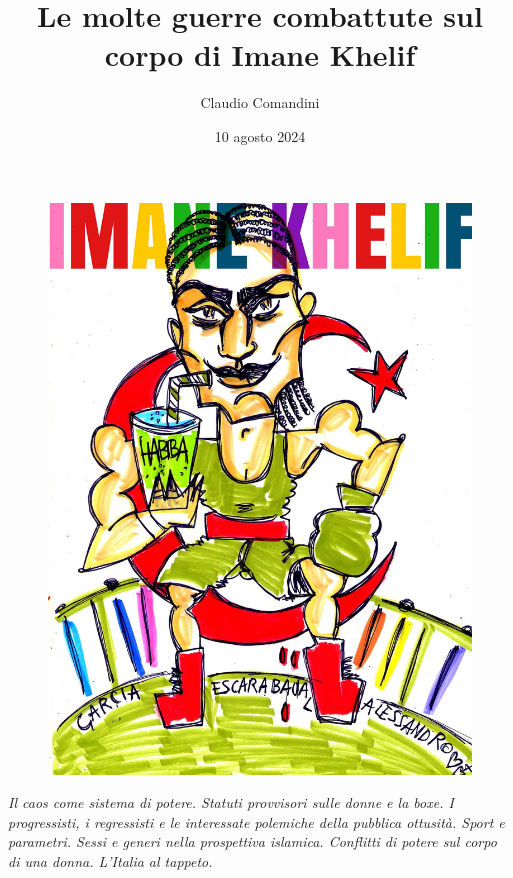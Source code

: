 \documentclass[
  letterpaper,
  DIV=11,
  numbers=noendperiod]{scrartcl}
\title{Le molte guerre combattute sul corpo di Imane Khelif}
\author{Claudio Comandini}
\date{10 agosto 2024}
\begin{document}
\maketitle
\ifdefined\Shaded\renewenvironment{Shaded}{\begin{tcolorbox}[boxrule=0pt, borderline west={3pt}{0pt}{shadecolor}, enhanced, interior hidden, frame hidden, sharp corners, breakable]}{\end{tcolorbox}}\fi

\begin{figure}

{\centering \includegraphics{images/Imane_Khelif.jpg}

}

\end{figure}

\emph{Il caos come sistema di potere. Statuti provvisori sulle donne e
la boxe. I progressisti, i regressisti e le interessate polemiche della
pubblica ottusità. Sport e parametri. Sessi e generi nella prospettiva
islamica. Conflitti di potere sul corpo di una donna. L'Italia al
tappeto.}
\end{document}
